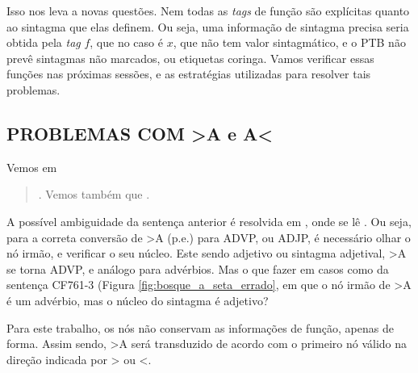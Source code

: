 Isso nos leva a novas questões. Nem todas as \textit{tags} de função são explícitas quanto ao sintagma que elas definem. Ou seja, uma informação de sintagma precisa seria obtida pela \textit{tag} $f$, que no caso é $x$, que não tem valor sintagmático, e o PTB não prevê sintagmas não marcados, ou etiquetas coringa. Vamos verificar essas funções nas próximas sessões, e as estratégias utilizadas para resolver tais problemas.

\subsection{PROBLEMAS COM >A e A<}
\label{subsec:bosque_a}

Vemos em 
\begin{quote}
    . Vemos também que .
\end{quote}

A possível ambiguidade da sentença anterior é resolvida em , onde se lê . Ou seja, para a correta conversão de >A (p.e.) para ADVP, ou ADJP, é necessário olhar o nó irmão, e verificar o seu núcleo. Este sendo adjetivo ou sintagma adjetival, >A se torna ADVP, e análogo para advérbios. Mas o que fazer em casos como da sentença CF761-3 (Figura \ref{fig:bosque_a_seta_errado}, em que o nó irmão de >A é um advérbio, mas o núcleo do sintagma é adjetivo? 
\begin{center}
    
\end{center}
Para este trabalho, os nós não conservam as informações de função, apenas de forma. Assim sendo, >A será transduzido de acordo com o primeiro nó válido na direção indicada por > ou <.

